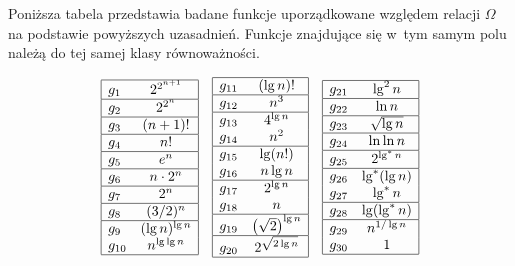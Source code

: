 Poniższa tabela przedstawia badane funkcje uporządkowane względem relacji $\Omega$ na podstawie powyższych uzasadnień. Funkcje znajdujące się w~tym samym polu należą do tej samej klasy równoważności.
\begin{table}[h]
	\begin{center}
		\[
			\begin{array}{|lc|} \hline
				g_1 & 2^{2^{n+1}} \\ \hline
				g_2 & 2^{2^n} \\ \hline
				g_3 & (n+1)! \\ \hline
				g_4 & n! \\ \hline
				g_5 & e^n \\ \hline
				g_6 & n\cdot2^n \\ \hline
				g_7 & 2^n \\ \hline
				g_8 & (3/2)^n \\ \hline
				g_9 & (\lg n)^{\lg n} \\
				g_{10} & n^{\lg\lg n} \\ \hline
			\end{array}
			\quad
			\begin{array}{|lc|} \hline
				g_{11} & (\lg n)! \\ \hline
				g_{12} & n^3 \\ \hline
				g_{13} & 4^{\lg n} \\
				g_{14} & n^2 \\ \hline
				g_{15} & \lg (n!) \\
				g_{16} & n\lg n \\ \hline
				g_{17} & 2^{\lg n} \\
				g_{18} & n \\ \hline
				g_{19} & \left(\sqrt{2}\right)^{\lg n} \\ \hline
				g_{20} & 2^{\sqrt{2\lg n}} \\ \hline
			\end{array}
			\quad
			\begin{array}{|lc|} \hline
				g_{21} & \lg^2n \\ \hline
				g_{22} & \ln n \\ \hline
				g_{23} & \sqrt{\lg n} \\ \hline
				g_{24} & \ln\ln n \\ \hline
				g_{25} & 2^{\lg^*n} \\ \hline
				g_{26} & \lg^*(\lg n) \\
				g_{27} & \lg^*n \\ \hline
				g_{28} & \lg(\lg^*n) \\ \hline
				g_{29} & n^{1/\lg n} \\
				g_{30} & 1 \\ \hline
			\end{array}
		\]
	\end{center}
	\caption{Uporządkowanie funkcji względem relacji $\Omega$}
\end{table}

